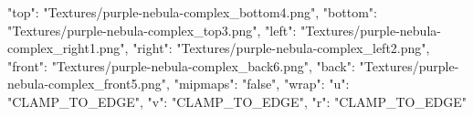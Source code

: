 {
  "top": "Textures/purple-nebula-complex_bottom4.png",
  "bottom": "Textures/purple-nebula-complex_top3.png",
  "left": "Textures/purple-nebula-complex_right1.png",
  "right": "Textures/purple-nebula-complex_left2.png",
  "front": "Textures/purple-nebula-complex_back6.png",
  "back": "Textures/purple-nebula-complex_front5.png",
  "mipmaps": "false",
  "wrap": {
    "u": "CLAMP_TO_EDGE",
    "v": "CLAMP_TO_EDGE",
    "r": "CLAMP_TO_EDGE"
  }
}